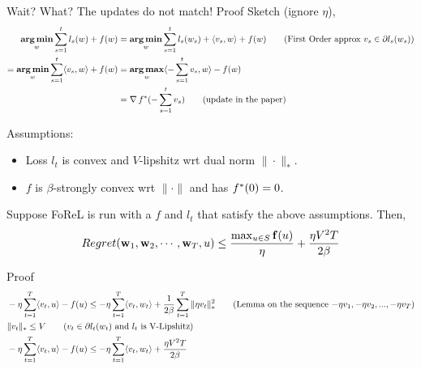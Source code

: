 \begin{frame}{Wait? What? The updates do not match!}
  Proof Sketch (ignore $\eta$),
  \begin{align*}
    \operatorname*{\mathbf{arg\,min}}_w \sum_{s=1}^t l_s(w) + f(w) &= \operatorname*{\mathbf{arg\,min}}_w \sum_{s=1}^t l_s(w_s)+\langle {v_s} , {w} \rangle + f(w) \tag{First Order approx $v_s \in  \partial l_s(w_s)$} \\
    = \operatorname*{\mathbf{arg\,min}}_w \sum_{s=1}^t \langle {v_s} , {w} \rangle + f(w) &= \operatorname*{\mathbf{arg\,max}}_w \langle {-\sum_{s=1}^t v_s} , {w} \rangle -f(w) \\
    &= \operatorname{\nabla} {f}^{*}(-\sum_{s=1}^t v_s) \tag{update in the paper}
  \end{align*}
\end{frame}
\begin{frame}
  Assumptions:
  \begin{itemize}
  \item Loss $l_t$ is convex and $V$-lipshitz wrt dual norm $\| \cdot \|_{*}$.
  \item $f$ is $\beta$-strongly convex wrt $\| \cdot \|$ and has ${f}^{*}(0)=0$.
  \end{itemize}

  \begin{theorem}
    Suppose FoReL is run with a $f$ and $l_t$ that satisfy the above assumptions. Then,
    \begin{align*}    
      Regret(\operatorname{\mathbf{w}}_1,\operatorname{\mathbf{w}}_2,\cdots,\operatorname{\mathbf{w}}_T,u) \le \frac{\max_{u \in S} \operatorname{\mathbf{f}}(u)}{\eta} + \frac{\eta V^2T}{2\beta}
    \end{align*}  
  \end{theorem}
\end{frame}

\begin{frame}{Proof}
    \begin{align*}    
      & -\eta\sum_{t=1}^T \langle {v_t} , {u} \rangle -f(u) \le -\eta\sum_{t=1}^T \langle {v_t} , {w_t} \rangle +\frac{1}{2\beta} \sum_{t=1}^T \|\eta v_t\|_{*}^2 \tag{Lemma on the sequence $-\eta v_1,-\eta v_2,...,-\eta v_T$}\\
      & \|v_t\|_{*} \le V \tag{$v_t \in \partial l_t(w_t)$ and $l_t$ is V-Lipshitz} \\
      & -\eta\sum_{t=1}^T \langle {v_t} , {u} \rangle -f(u) \le -\eta\sum_{t=1}^T \langle {v_t} , {w_t} \rangle +\frac{\eta V^2T}{2\beta} \\
    \end{align*}
\end{frame}

